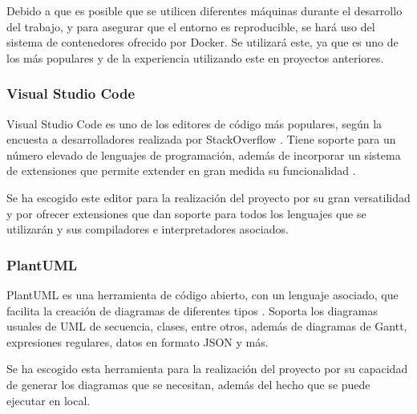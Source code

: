 Debido a que es posible que se utilicen diferentes máquinas durante el desarrollo del trabajo, y para asegurar que el entorno es reproducible, se hará uso del sistema de contenedores ofrecido por Docker. Se utilizará este, ya que es uno de los más populares y de la experiencia utilizando este en proyectos anteriores.

\subsubsection{Visual Studio Code}

Visual Studio Code es uno de los editores de código más populares, según la encuesta a desarrolladores realizada por StackOverflow \cite{2023devsurvey}. Tiene soporte para un número elevado de lenguajes de programación, además de incorporar un sistema de extensiones que permite extender en gran medida su funcionalidad \cite{vscodeweb}.

Se ha escogido este editor para la realización del proyecto por su gran versatilidad y por ofrecer extensiones que dan soporte para todos los lenguajes que se utilizarán y sus compiladores e interpretadores asociados.

\color{blue}  %
\subsubsection{PlantUML}

PlantUML es una herramienta de código abierto, con un lenguaje asociado, que facilita la creación de diagramas de diferentes tipos \cite{plantumlweb}. Soporta los diagramas usuales de UML de secuencia, clases, entre otros, además de diagramas de Gantt, expresiones regulares, datos en formato JSON y más.

Se ha escogido esta herramienta para la realización del proyecto por su capacidad de generar los diagramas que se necesitan, además del hecho que se puede ejecutar en local.
\color{black}  %
